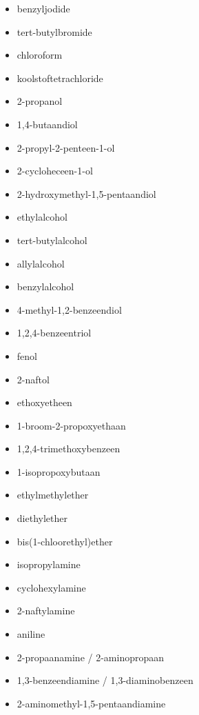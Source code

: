 \documentclass[a4paper,12pt]{article}
\begin{document}
\begin{enumerate}
\begin{enumerate}
\begin{itemize}
                    \item benzyljodide
                    \item tert-butylbromide
                    \item chloroform
                    \item koolstoftetrachloride
                    \item 2-propanol
                    \item 1,4-butaandiol
                    \item 2-propyl-2-penteen-1-ol
                    \item 2-cycloheceen-1-ol
                    \item 2-hydroxymethyl-1,5-pentaandiol
                    \item ethylalcohol
                    \item tert-butylalcohol
                    \item allylalcohol
                    \item benzylalcohol
                    \item 4-methyl-1,2-benzeendiol
                    \item 1,2,4-benzeentriol
                    \item fenol
                    \item 2-naftol
                    \item ethoxyetheen
                    \item 1-broom-2-propoxyethaan
                    \item 1,2,4-trimethoxybenzeen
                    \item 1-isopropoxybutaan
                    \item ethylmethylether
                    \item diethylether
                    \item bis(1-chloorethyl)ether
                    \item isopropylamine
                    \item cyclohexylamine
                    \item 2-naftylamine
                    \item aniline
                    \item 2-propaanamine / 2-aminopropaan
                    \item 1,3-benzeendiamine / 1,3-diaminobenzeen
                    \item 2-aminomethyl-1,5-pentaandiamine

\end{itemize}
\end{enumerate}
\end{enumerate}
\end{document}

